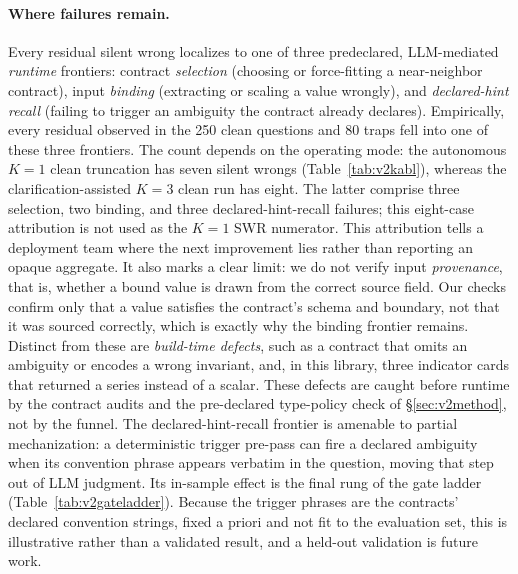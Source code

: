 \documentclass[sigconf,anonymous]{acmart}
\newcommand{\vqAbstainAll}{8}
\newcommand{\vqSelAccAll}{96.7\%}
\newcommand{\vqSWRAll}{3.2\%}
\newcommand{\vqtAbstainAll}{12}
\newcommand{\vqtSWRAll}{1.2\%}
\newcommand{\vqtSelAccAll}{98.7\%}
\begin{document}
\paragraph{Where failures remain.}
Every residual silent wrong localizes to one of three predeclared, LLM-mediated \emph{runtime} frontiers: contract \emph{selection} (choosing or force-fitting a near-neighbor contract), input \emph{binding} (extracting or scaling a value wrongly), and \emph{declared-hint recall} (failing to trigger an ambiguity the contract already declares).
Empirically, every residual observed in the 250 clean questions and 80 traps fell into one of these three frontiers. The count depends on the operating mode: the autonomous $K{=}1$ clean truncation has seven silent wrongs (Table~\ref{tab:v2kabl}), whereas the clarification-assisted $K{=}3$ clean run has eight. The latter comprise three selection, two binding, and three declared-hint-recall failures; this eight-case attribution is not used as the $K{=}1$ SWR numerator.
This attribution tells a deployment team where the next improvement lies rather than reporting an opaque aggregate.
It also marks a clear limit: we do not verify input \emph{provenance}, that is, whether a bound value is drawn from the correct source field. Our checks confirm only that a value satisfies the contract's schema and boundary, not that it was sourced correctly, which is exactly why the binding frontier remains.
Distinct from these are \emph{build-time defects}, such as a contract that omits an ambiguity or encodes a wrong invariant, and, in this library, three indicator cards that returned a series instead of a scalar. These defects are caught before runtime by the contract audits and the pre-declared type-policy check of \S\ref{sec:v2method}, not by the funnel.
The declared-hint-recall frontier is amenable to partial mechanization: a deterministic trigger pre-pass can fire a declared ambiguity when its convention phrase appears verbatim in the question, moving that step out of LLM judgment.
Its in-sample effect is the final rung of the gate ladder (Table~\ref{tab:v2gateladder}). Because the trigger phrases are the contracts' declared convention strings, fixed a priori and not fit to the evaluation set, this is illustrative rather than a validated result, and a held-out validation is future work.
\end{document}
